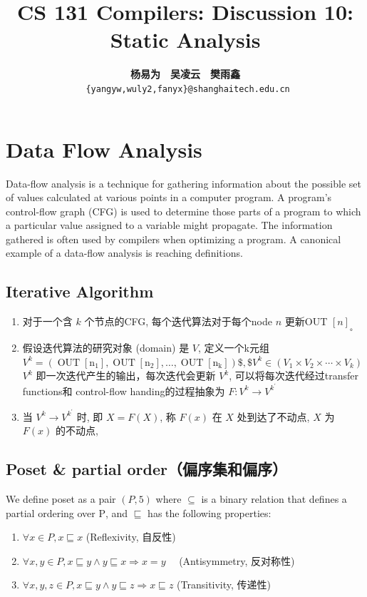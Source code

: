 \documentclass[a4paper]{article}
\title{CS 131 Compilers: Discussion 10: Static Analysis}
\author{\textbf{杨易为}~~\textbf{吴凌云}~~\textbf{樊雨鑫} \\ \texttt{ \{yangyw,wuly2,fanyx\}@shanghaitech.edu.cn}}
\theoremstyle{definition}
\begin{document}
\maketitle
\section{Data Flow Analysis\cite{njuswanalysis}}
Data-flow analysis is a technique for gathering information about the possible set of values calculated at various points in a computer program. A program's control-flow graph (CFG) is used to determine those parts of a program to which a particular value assigned to a variable might propagate. The information gathered is often used by compilers when optimizing a program. A canonical example of a data-flow analysis is reaching definitions.
\subsection{Iterative Algorithm}
\begin{enumerate}
  \item 对于一个含 $k$ 个节点的CFG, 每个迭代算法对于每个node $n$ 更新OUT $[n]_{\text {。 }}$
  \item 假设迭代算法的研究对象 (domain) 是 $V$, 定义一个k元组
  $V^{k}=\left(\operatorname{OUT}\left[\mathrm{n}_{1}\right], \operatorname{OUT}\left[\mathrm{n}_{2}\right], \ldots, \operatorname{OUT}\left[\mathrm{n}_{\mathrm{k}}\right]\right) \$, \$ V^{k} \in\left(V_{1} \times V_{2} \times \cdots \times V_{k}\right)$
  $V^{k}$ 即一次迭代产生的输出，每次迭代会更新 $V^{k}$, 可以将每次迭代经过transfer functions和 control-flow handing的过程抽象为 $F: V^{k} \rightarrow V^{k^{\prime}}$
  \item 当 $V^{k} \rightarrow V^{k^{\prime}}$ 时,
  即 $X=F(X)$, 称 $F(x)$ 在 $X$ 处到达了不动点, $X$ 为 $F(x)$ 的不动点,
\end{enumerate}

\subsection{Poset \& partial order（偏序集和偏序）}
We define poset as a pair $(P, 5)$ where $\subseteq$ is a binary relation that defines a partial ordering
over $\mathrm{P}$, and $\sqsubseteq$ has the following properties:
\begin{enumerate}
 \item $\forall x \in P, x \sqsubseteq x$ (Reflexivity, 自反性)
 \item $\forall x, y \in P, x \sqsubseteq y \wedge y \sqsubseteq x \Rightarrow x=y \quad$ (Antisymmetry, 反对称性)
 \item $\forall x, y, z \in P, x \sqsubseteq y \wedge y \sqsubseteq z \Rightarrow x \sqsubseteq z$ (Transitivity, 传递性)
\end{enumerate}
\end{document}
